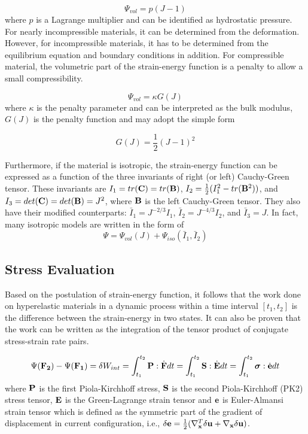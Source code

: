 \begin{equation} \label{Lagrange}
\Psi_{vol} = p(J-1)
\end{equation} 
where $p$ is a Lagrange multiplier and can be identified as hydrostatic pressure. For nearly incompressible materials, it can be determined from the deformation. However, for incompressible materials, it has to be determined from the equilibrium equation and boundary conditions in addition. For compressible material, the volumetric part of the strain-energy function is a penalty to allow a small compressibility.

\begin{equation} \label{penalty}
\Psi_{vol} = \kappa G(J)
\end{equation}
where $\kappa$ is the penalty parameter and can be interpreted as the bulk modulus, $G(J)$ is the penalty function and may adopt the simple form

\begin{equation} \label{penalty2}
G(J) = \frac{1}{2}(J - 1)^2
\end{equation}

Furthermore, if the material is isotropic, the strain-energy function can be expressed as a function of the three invariants of right (or left) Cauchy-Green tensor. 
These invariants are 
$I_1 = tr(\bold{C}) = tr(\bold{B})$, $I_2 = \frac{1}{2}(I_1^2 - tr(\bold{B}^2))$, and $I_3 = det(\bold{C}) = det(\bold{B}) = J^2$, where $\bold{B}$ is the left Cauchy-Green tensor. 
They also have their modified counterparts: $\bar{I}_1 = J^{-2/3}I_1$, $\bar{I}_2 = J^{-4/3}I_2$, and $\bar{I}_3 = J$. In fact, many isotropic models are written in the form of
\begin{equation}
\Psi = \Psi_{vol}(J) + \Psi_{iso}(\bar{I}_1, \bar{I}_2)
\end{equation}


%
\subsection{Stress Evaluation} \label{general_stress}
Based on the postulation of strain-energy function, it follows that the work done on hyperelastic materials in a dynamic process within a time interval $[t_1, t_2]$ is the difference between the strain-energy in two states. It can also be proven that the work can be written as the integration of the tensor product of conjugate stress-strain rate pairs.

\begin{equation}
\Psi({\bold{F_2}}) - \Psi({\bold{F_1}}) = \delta{W_{int}} = \int_{t_1}^{t_2}\bold{P}:\dot{\bold{F}}dt = \int_{t_1}^{t_2}\bold{S}:\dot{\bold{E}}dt = 
\int_{t_1}^{t_2}\boldsymbol{\sigma}:\dot{\bold{e}}dt
\end{equation}
where $\bold{P}$ is the first Piola-Kirchhoff stress, $\bold{S}$ is the second Piola-Kirchhoff (PK2) stress tensor, $\bold{E}$ is the Green-Lagrange strain tensor and $\bold{e}$ is Euler-Almansi strain tensor which is defined as the symmetric part of the gradient of displacement in current configuration, i.e., $\delta\bold{e} = \frac{1}{2}( \nabla_{\bold{x}}^T\delta\bold{u} + \nabla_{\bold{x}}\delta\bold{u} )$.

